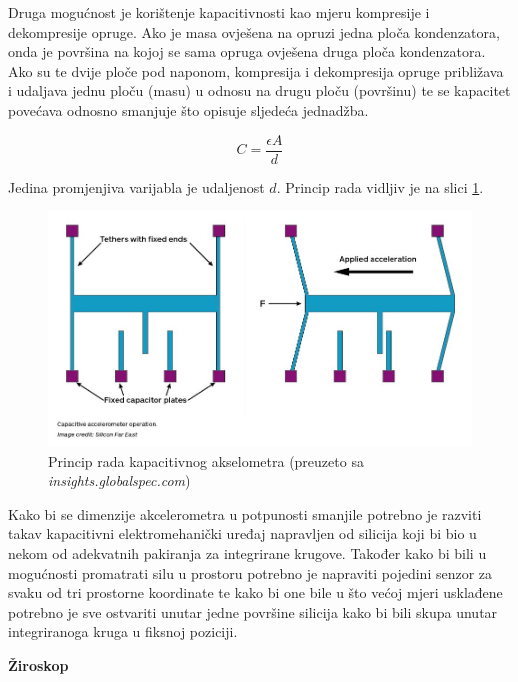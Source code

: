 \documentclass[times, utf8, diplomski]{fer}
\begin{document}
Druga mogućnost je korištenje kapacitivnosti kao mjeru kompresije i dekompresije opruge. Ako je masa ovješena na opruzi jedna ploča
kondenzatora, onda je površina na kojoj se sama opruga ovješena druga ploča kondenzatora. Ako su te dvije ploče pod naponom,
kompresija i dekompresija opruge približava i udaljava jednu ploču (masu) u odnosu na drugu ploču (površinu) te se kapacitet
povećava odnosno smanjuje što opisuje sljedeća jednadžba.

$$
C = \frac{\epsilon A}{d}
$$

Jedina promjenjiva varijabla je udaljenost $d$. Princip rada vidljiv je na slici \ref{accmtr}.


\begin{figure}[h!]
    \includegraphics[width=\textwidth]{Accelerometers.jpg}
    \caption{Princip rada kapacitivnog akselometra (preuzeto sa \textit{insights.globalspec.com})}
    \label{accmtr}
\end{figure}

Kako bi se dimenzije akcelerometra u potpunosti smanjile potrebno je razviti takav kapacitivni elektromehanički uređaj napravljen od
silicija koji bi bio u nekom od adekvatnih pakiranja za integrirane krugove. Također kako bi bili u mogućnosti promatrati silu u
prostoru potrebno je napraviti pojedini senzor za svaku od tri prostorne koordinate te kako bi one bile u što većoj mjeri usklađene
potrebno je sve ostvariti unutar jedne površine silicija kako bi bili skupa unutar integriranoga kruga u fiksnoj poziciji.

\textbf{Žiroskop}
\end{document}
